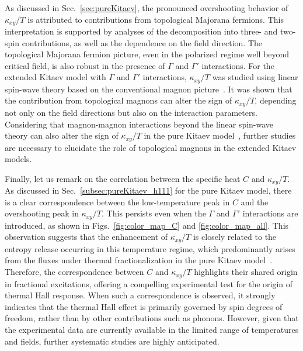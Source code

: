 \documentclass[twocolumn,superscriptaddress,showpacs, longbibliography, aps, prx]{revtex4-2}
\begin{document}
As discussed in Sec.~\ref{sec:pureKitaev}, the pronounced overshooting behavior of $\kappa_{xy}/T$ is attributed to contributions from topological Majorana fermions. 
This interpretation is supported by analyses of the decomposition into three- and two-spin contributions, as well as the dependence on the field direction. 
The topological Majorana fermion picture, even in the polarized regime well beyond critical field, is also robust in the presence of $\Gamma$ and $\Gamma'$ interactions. 
For the extended Kitaev model with $\Gamma$ and $\Gamma'$ interactions, $\kappa_{xy}/T$ was studied using linear spin-wave theory based on the conventional magnon picture~\cite{ChernZK2021,ZhangCK2021}. 
It was shown that the contribution from topological magnons can alter the sign of $\kappa_{xy}/T$, depending not only on the field directions but also on the interaction parameters. 
Considering that magnon-magnon interactions beyond the linear spin-wave theory can also alter the sign of $\kappa_{xy}/T$ in the pure Kitaev model~\cite{Koyama2024}, further studies are necessary to elucidate the role of topological magnons in the extended Kitaev models.

Finally, let us remark on the correlation between the specific heat $C$ and $\kappa_{xy}/T$. 
As discussed in Sec.~\ref{subsec:pureKitaev_h111} for the pure Kitaev model, there is a clear correspondence between the low-temperature peak in $C$ and the overshooting peak in $\kappa_{xy}/T$. 
This persists even when the $\Gamma$ and $\Gamma'$ interactions are introduced, as shown in Figs.~\ref{fig:color_map_C} and \ref{fig:color_map_all}. 
This observation suggests that the enhancement of $\kappa_{xy}/T$ is closely related to the entropy release occurring in this temperature regime, which predominantly arises from the fluxes under thermal fractionalization in the pure Kitaev model~\cite{NasuUM2015}. 
Therefore, the correspondence between $C$ and $\kappa_{xy}/T$ highlights their shared origin in fractional excitations, offering a compelling experimental test for the origin of thermal Hall response. 
When such a correspondence is observed, it strongly indicates that the thermal Hall effect is primarily governed by spin degrees of freedom, rather than by other contributions such as phonons. 
However, given that the experimental data are currently available in the limited range of temperatures and fields, further systematic studies are highly anticipated. 
\end{document}
